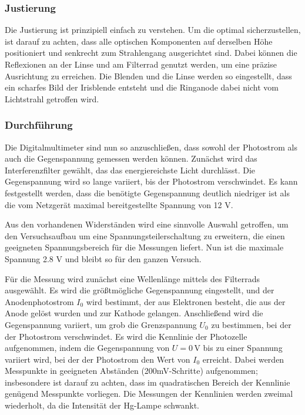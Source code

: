 \documentclass{article}
\begin{document}
\subsubsection*{Justierung}
Die Justierung ist prinzipiell einfach zu verstehen. Um die optimal sicherzustellen, ist darauf zu achten, dass alle optischen 
Komponenten auf derselben Höhe positioniert und senkrecht zum Strahlengang ausgerichtet 
sind. Dabei können die Reflexionen an der Linse und am Filterrad genutzt werden, um eine 
präzise Ausrichtung zu erreichen. Die Blenden und die Linse werden so eingestellt, dass ein 
scharfes Bild der Irisblende entsteht und die Ringanode dabei nicht vom Lichtstrahl getroffen 
wird.

\subsubsection*{Durchführung}
Die Digitalmultimeter sind nun so anzuschließen, dass sowohl der Photostrom als auch die Gegenspannung gemessen werden können.
Zunächst wird das Interferenzfilter gewählt, das das energiereichste Licht durchlässt. 
Die Gegenspannung wird so lange variiert, bis der Photostrom verschwindet. Es kann festgestellt 
werden, dass die benötigte Gegenspannung deutlich niedriger ist als die vom Netzgerät maximal 
bereitgestellte Spannung von 12 V.

Aus den vorhandenen Widerständen wird eine sinnvolle Auswahl getroffen, um den Versuchsaufbau
 um eine Spannungsteilerschaltung zu erweitern, die einen geeigneten Spannungsbereich für die
  Messungen liefert. Nun ist die maximale Spannung 2.8 V und bleibt so für den ganzen Versuch.

Für die Messung wird zunächst eine Wellenlänge mittels des Filterrads ausgewählt. 
Es wird die größtmögliche Gegenspannung eingestellt, und der Anodenphotostrom $I_0$ 
wird bestimmt, der aus Elektronen besteht, die aus der Anode gelöst wurden und zur 
Kathode gelangen. Anschließend wird die Gegenspannung variiert, um grob die Grenzspannung
 $U_0$ zu bestimmen, bei der der Photostrom verschwindet. Es wird die Kennlinie der 
 Photozelle aufgenommen, indem die Gegenspannung von $U = 0\,\mathrm{V}$ bis zu einer 
 Spannung variiert wird, bei der der Photostrom den Wert von $I_0$ erreicht. Dabei 
 werden Messpunkte in geeigneten Abständen (200mV-Schritte) aufgenommen; insbesondere ist darauf zu achten, 
 dass im quadratischen Bereich der Kennlinie genügend Messpunkte vorliegen.
Die Messungen der Kennlinien werden zweimal wiederholt, da die Intensität der Hg-Lampe schwankt.
\end{document}
